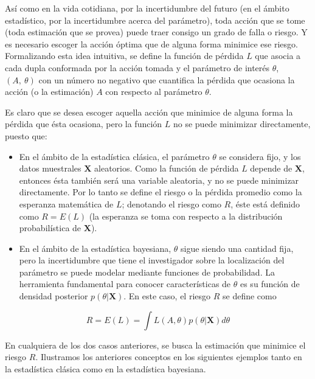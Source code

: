 \documentclass[
  10pt,
  spanish,
]{book}
\theoremstyle{definition}
\theoremstyle{definition}
\theoremstyle{definition}
\theoremstyle{definition}
\theoremstyle{remark}
\begin{document}
Así como en la vida cotidiana, por la incertidumbre del futuro (en el ámbito estadístico, por la incertidumbre acerca del parámetro), toda acción que se tome (toda estimación que se provea) puede traer consigo un grado de falla o riesgo. Y es necesario escoger la acción óptima que de alguna forma minimice ese riesgo. Formalizando esta idea intuitiva, se define la función de pérdida \(L\) que asocia a cada dupla conformada por la acción tomada y el parámetro de interés \(\theta\), \((A, \ \theta)\) con un número no negativo que cuantifica la pérdida que ocasiona la acción (o la estimación) \(A\) con respecto al parámetro \(\theta\).

Es claro que se desea escoger aquella acción que minimice de alguna forma la pérdida que ésta ocasiona, pero la función \(L\) no se puede minimizar directamente, puesto que:

\begin{itemize}
\item
  En el ámbito de la estadística clásica, el parámetro \(\theta\) se considera fijo, y los datos muestrales \(\mathbf{X}\) aleatorios. Como la función de pérdida \(L\) depende de \(\mathbf{X}\), entonces ésta también será una variable aleatoria, y no se puede minimizar directamente. Por lo tanto se define el riesgo o la pérdida promedio como la esperanza matemática de \(L\); denotando el riesgo como \(R\), éste está definido como \(R=E(L)\) (la esperanza se toma con respecto a la distribución probabilística de \(\mathbf{X}\)).
\item
  En el ámbito de la estadística bayesiana, \(\theta\) sigue siendo una cantidad fija, pero la incertidumbre que tiene el investigador sobre la localización del parámetro se puede modelar mediante funciones de probabilidad. La herramienta fundamental para conocer características de \(\theta\) es su función de densidad posterior \(p(\theta|\mathbf{X})\). En este caso, el riesgo \(R\) se define como
\end{itemize}

\begin{equation*}
R=E(L)=\int L(A, \theta)p(\theta|\mathbf{X})d\theta
\end{equation*}

En cualquiera de los dos casos anteriores, se busca la estimación que minimice el riesgo \(R\). Ilustramos los anteriores conceptos en los siguientes ejemplos tanto en la estadística clásica como en la estadística bayesiana.
\end{document}

